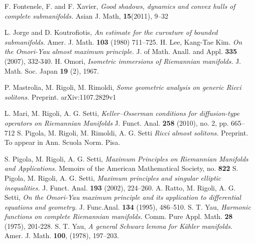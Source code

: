 \documentclass[a4paper]{amsart}
\begin{document}
\begin{thebibliography}{99}
F.  Fontenele, F. and F. Xavier, {\em Good shadows, dynamics and convex hulls of complete submanifolds.} Asian J. Math, \textbf{15}(2011), 9--32

L.  Jorge  and  D. Koutrofiotis,
{\em An estimate for the curvature of bounded submanifolds.} Amer. J. Math.  {\bf 103} (1980) 711--725.
H.  Lee,   Kang-Tae Kim. {\em On the Omori-Yau almost maximum principle. } J. of Math. Anall. and Appl. \textbf{335} (2007), 332-340.
  H. Omori, {\em  Isometric immersions of Riemannian manifolds.} J. Math. Soc. Japan
 \textbf{19} (2), 1967.

P. Mastrolia, M. Rigoli, M. Rimoldi, {\em Some geometric analysis on generic Ricci solitons.}
Preprint. arXiv:1107.2829v1 

 L. Mari, M. Rigoli, A. G. Setti, {\em Keller--Osserman conditions for diffusion-type operators on Riemannian Manifolds } J. Funct. Anal. \textbf{258} (2010), no. 2, pp. 665--712
 S. Pigola, M. Rigoli, M. Rimoldi, A. G. Setti {\em  Ricci almost solitons.} Preprint. To appear in Ann. Scuola Norm.
Pisa.

 S. Pigola, M. Rigoli, A. G. Setti, {\em Maximum Principles on Riemannian Manifolds and Applications.} Memoirs of the American Mathematical Society, no. \textbf{822}
 S. Pigola, M. Rigoli, A. G. Setti, {\em Maximum principles and singular elliptic inequalities.} J. Funct. Anal. \textbf{193} (2002), 224--260.
 A. Ratto, M.  Rigoli, A. G.  Setti, {\em On the Omori-Yau maximum principle and its application to differential equations and geometry.} J. Func.Anal. \textbf{134} (1995), 486--510.
S. T. Yau, {\em  Harmonic functions on complete Riemannian manifolds.} Comm. Pure Appl.
Math. \textbf{28} (1975), 201-228.
S. T. Yau, {\em A general Schwarz lemma for K\"{a}hler manifolds.} Amer. J. Math. \textbf{100}, (1978),  197--203.

\end{thebibliography}
\end{document}
